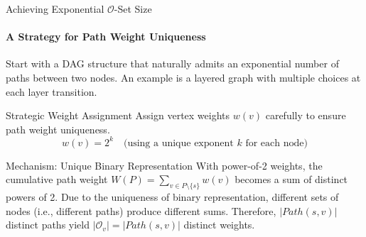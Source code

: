 \documentclass{beamer}
\begin{document}
\begin{frame}[noframenumbering]{Achieving Exponential $\mathcal{O}$-Set Size}
    \framesubtitle{A Strategy for Path Weight Uniqueness}

    Start with a DAG structure that naturally admits an exponential number of paths between two nodes. An example is a layered graph with multiple choices at each layer transition.

    \begin{alertblock}{Strategic Weight Assignment}
        Assign vertex weights $w(v)$ carefully to ensure path weight uniqueness.
        \[ w(v) = 2^k \quad \text{(using a unique exponent } k \text{ for each node)} \]
    \end{alertblock}

    \pause

    \begin{block}{Mechanism: Unique Binary Representation}
        With power-of-2 weights, the cumulative path weight $W(P) = \sum_{v \in P \setminus \{s\}} w(v)$ becomes a sum of distinct powers of 2.
        Due to the uniqueness of binary representation, different sets of nodes (i.e., different paths) produce different sums.
        Therefore, $|Path(s, v)|$ distinct paths yield $|\mathcal{O}_v| = |Path(s, v)|$ distinct weights.
    \end{block}

\end{frame}
\end{document}

